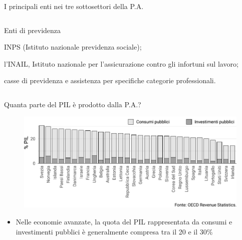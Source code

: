 \documentclass[aspectratio=64,12pt]{beamer}
\newenvironment{nobulletlist}{\begin{list}{--}{\itemsep=3pt\itemindent=2ex\labelsep=.7ex\leftmargin=0pt}}{\end{list}}
\begin{document}
\begin{frame}{I principali enti nei tre sottosettori della P.A.}
\begin{columns}[t]
\begin{column}{.33\columnwidth}
\begin{block}{\footnotesize Enti di previdenza}
\begin{nobulletlist}
\item INPS (Istituto nazionale previdenza sociale);
\item l’INAIL, Istituto nazionale per l’assicurazione contro gli infortuni sul la\-voro;
\item casse di previdenza e assistenza per specifiche categorie professio\-nali.
\end{nobulletlist}
\end{block}
\end{column}
\end{columns}
\end{frame}

\begin{frame}{Quanta parte del PIL è prodotto dalla P.A.?}

\begin{figure}
\centering
\includegraphics[width=.9\textwidth]{./figure/consumi-investimenti-pubblici-PIL.pdf}
\end{figure}

\begin{itemize}
\item Nelle economie avanzate, la quota del PIL rappresentata da consumi e
investimenti pubblici è generalmente compresa tra il 20 e il 30\%
\end{itemize}

\end{frame}
\end{document}
